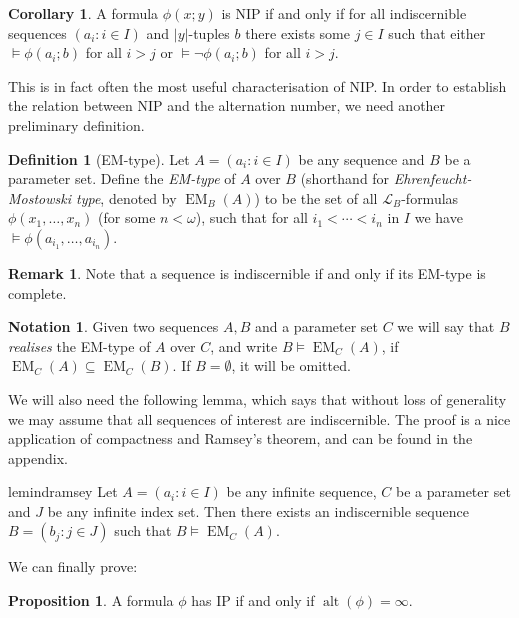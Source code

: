 \documentclass[a4paper]{report}
\newcommand{\ind}{\hspace{15pt}}
\renewcommand{\L}{\mathcal{L}}
\DeclareMathOperator{\EM}{EM}
\DeclareMathOperator{\alt}{alt}
\theoremstyle{definition}
\newtheorem{prop}[thm]{Proposition}
\newtheorem{cor}[thm]{Corollary}
\newtheorem{defn}[thm]{Definition}
\theoremstyle{remstyle}
\newtheorem{rem}[thm]{Remark}
\newtheorem*{notation}{Notation}
\begin{document}
\begin{cor}\label{nipendsegment}
	A formula $\phi(x;y)$ is NIP if and only if for all indiscernible sequences $(a_i:i\in I)$ and $|y|$-tuples $b$ there exists some $j \in I$ such that either $\models\phi(a_i;b)$ for all $i>j$ or $\models\neg\phi(a_i;b)$ for all $i> j$.
\end{cor}

\ind This is in fact often the most useful characterisation of NIP. In order to establish the relation between NIP and the alternation number, we need another preliminary definition.

\begin{defn}[EM-type]
	Let $A=(a_i:i\in I)$ be any sequence and $B$ be a parameter set. Define the \emph{EM-type} of $A$ over $B$ (shorthand for \emph{Ehrenfeucht-Mostowski type}, denoted by $\EM_B(A)$) to be the set of all $\L_B$-formulas $\phi(x_1,\ldots,x_n)$ (for some $n<\omega$), such that for all $i_1<\cdots<i_n$ in $I$ we have $\models \phi(a_{i_1},\ldots,a_{i_n})$.
\end{defn}

\begin{rem}
	Note that a sequence is indiscernible if and only if its EM-type is complete.
\end{rem}

\begin{notation}
	Given two sequences $A,B$ and a parameter set $C$ we will say that $B$ \emph{realises} the EM-type of $A$ over $C$, and write $B\models \EM_C(A)$, if $\EM_C(A)\subseteq\EM_C(B)$. If $B=\emptyset$, it will be omitted.
\end{notation}

\ind We will also need the following lemma, which says that without loss of generality we may assume that all sequences of interest are indiscernible. The proof is a nice application of compactness and Ramsey's theorem, and can be found in the appendix.

\begin{restatable}[]{lem}{indramsey}\label{indramsey}
	Let $A=(a_i:i\in I)$ be any infinite sequence, $C$ be a parameter set and $J$ be any infinite index set. Then there exists an indiscernible sequence $B=(b_j:j\in J)$ such that $B\models \EM_C(A)$.
\end{restatable}

\ind We can finally prove:

\begin{prop}\label{ipalt}
	A formula $\phi$ has IP if and only if $\alt(\phi)=\infty$.
\end{prop}
\end{document}

